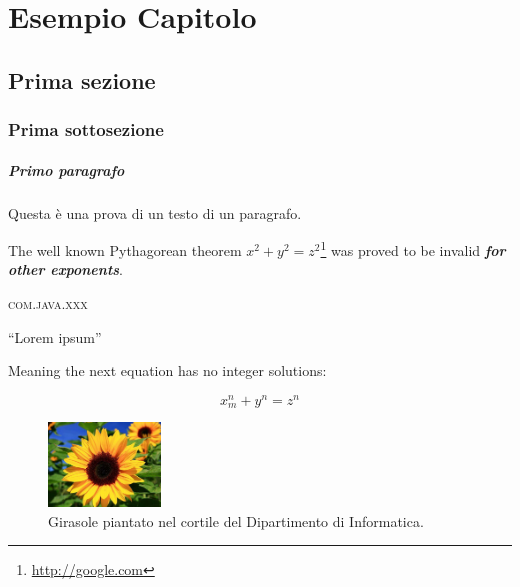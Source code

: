 \chapter{Esempio Capitolo} %
%


\section{Prima sezione}

\subsection{Prima sottosezione}

\paragraph{Primo paragrafo} Questa è una prova di un testo di un paragrafo.

The well known Pythagorean theorem $x^2 + y^2 = z^2$\footnote{\url{http://google.com}} was 
proved to be invalid \textbf{\textit{for other exponents}}. 

\textsc{com.java.xxx}

``Lorem ipsum''

Meaning the next equation has no integer solutions:

\[ x^n_m + y^n = z^n \]

\begin{figure}[h]
\includegraphics[width=3cm]{figure/picture.pdf}
\centering
\caption{Girasole piantato nel cortile del Dipartimento di Informatica.}
\end{figure}






